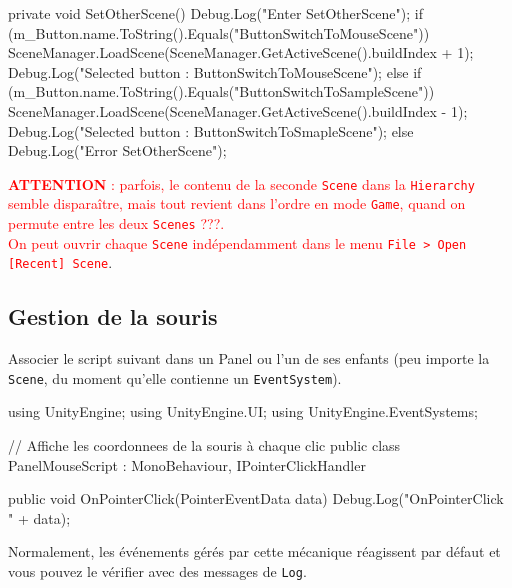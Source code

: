 \documentclass[a4paper,10pt]{article}
\newenvironment{solution}%
{\begin{tcolorbox}[breakable,colback=red!5!white,colframe=red!75!black,title=Solution]}%
{\end{tcolorbox}}
\newenvironment{boxcode}%
{\begin{tcolorbox}[breakable,colback=gray!5!white,colframe=black]}%
	{\end{tcolorbox}}
\begin{document}
\begin{solution}
\begin{boxcode}
\begin{csharpsansbord}
{	private void SetOtherScene() {
		Debug.Log("Enter SetOtherScene");
		if (m_Button.name.ToString().Equals("ButtonSwitchToMouseScene")) {
			SceneManager.LoadScene(SceneManager.GetActiveScene().buildIndex + 1);
			Debug.Log("Selected button : ButtonSwitchToMouseScene");
		}
		else if (m_Button.name.ToString().Equals("ButtonSwitchToSampleScene")) {
			SceneManager.LoadScene(SceneManager.GetActiveScene().buildIndex - 1);
			Debug.Log("Selected button : ButtonSwitchToSmapleScene");
		}
		else {
			Debug.Log("Error SetOtherScene");
		}
	}
}

\end{csharpsansbord}
\end{boxcode}		

\textcolor{red}{\textbf{ATTENTION} : parfois, le contenu de la seconde \texttt{Scene} dans la \texttt{Hierarchy} semble disparaître, mais tout revient dans l'ordre en mode \texttt{Game}, quand on permute entre les deux \texttt{Scenes} ???. \\
On peut ouvrir chaque \texttt{Scene} indépendamment dans le menu \texttt{File > Open  [Recent] Scene}}.



\subsection{Gestion de la souris}
Associer le script  suivant dans un Panel ou l'un de ses enfants (peu importe la \texttt{Scene}, du moment qu'elle contienne un \texttt{EventSystem}).

\begin{boxcode}
\begin{csharpsansbord}
using UnityEngine;
using UnityEngine.UI;
using UnityEngine.EventSystems;

// Affiche les coordonnees de la souris à chaque clic
public class PanelMouseScript : MonoBehaviour, IPointerClickHandler
{
	public void OnPointerClick(PointerEventData data)
	{
		Debug.Log("OnPointerClick " + data);
	}
	
}
\end{csharpsansbord}
\end{boxcode}
\end{solution}	
\fi 



Normalement, les événements gérés par cette mécanique réagissent par défaut et vous pouvez le vérifier avec des messages de \texttt{Log}.
\end{document}
